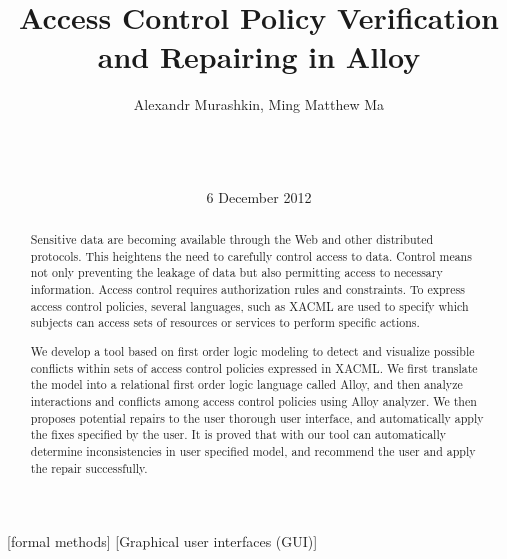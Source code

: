 \documentclass{acm_proc_article-sp}
\begin{document}
\title{Access Control Policy Verification and Repairing in Alloy}


\author{
\alignauthor Alexandr Murashkin, Ming Matthew Ma \\
       \\
       \\
       \\
}
\date{6 December 2012}
\maketitle

\begin{abstract}

Sensitive data are becoming available through the Web and other distributed protocols. This heightens the need to carefully control access to data. Control means not only preventing the leakage of data but also permitting access to necessary information. Access control requires authorization rules and constraints. To express access control policies, several languages,
such as XACML are used to specify which subjects can  access sets of resources
or services to perform specific actions. 

We develop a tool based on first order logic modeling to detect and visualize possible conflicts within sets of access control policies expressed in XACML. We first translate the model
into a relational first order logic language called Alloy, and then analyze interactions
and conflicts among access control policies using Alloy analyzer. We then proposes potential repairs to the user thorough user interface, and automatically apply the fixes specified by the user. It is proved that with our tool can automatically determine inconsistencies in user specified model, and recommend the user and apply the repair successfully. 

\end{abstract}

[formal methods]
[Graphical user interfaces (GUI)]


\end{document}
